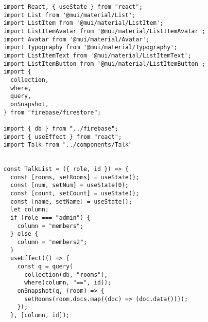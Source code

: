 \begin{verbatim}
import React, { useState } from "react";
import List from '@mui/material/List';
import ListItem from '@mui/material/ListItem';
import ListItemAvatar from '@mui/material/ListItemAvatar';
import Avatar from '@mui/material/Avatar';
import Typography from '@mui/material/Typography';
import ListItemText from '@mui/material/ListItemText';
import ListItemButton from '@mui/material/ListItemButton';
import {
  collection,
  where,
  query,
  onSnapshot,
} from "firebase/firestore";

import { db } from "../firebase";
import { useEffect } from "react";
import Talk from "../components/Talk"


const TalkList = ({ role, id }) => {
  const [rooms, setRooms] = useState();
  const [num, setNum] = useState(0);
  const [count, setCount] = useState();
  const [name, setName] = useState();
  let column;
  if (role === "admin") {
    column = "members";
  } else {
    column = "members2";
  }
  useEffect(() => {
    const q = query(
      collection(db, "rooms"),
      where(column, "==", id));
    onSnapshot(q, (room) => {
      setRooms(room.docs.map((doc) => (doc.data())));
    });
  }, [column, id]);



\end{verbatim}
